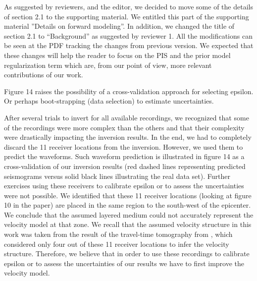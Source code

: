 \documentclass[10pt]{extarticle}
\begin{document}
\begin{Answer}
As suggested by reviewers, and the editor, we decided to move some of the 
details of section 2.1 to the supporting material. We entitled this part of the 
supporting material ''Details on forward modeling''. In addition, we changed 
the title of section 2.1 to ``Background'' as suggested by reviewer 1.
All the modifications can be seen at the PDF tracking the changes from previous version.
We expected that these changes will help the reader to focus on the PIS and the 
prior model regularization term which are, from our point of view, more relevant 
contributions of our work. \\
 \WorkInProgressRevTask
\end{Answer}
%
%
\begin{ReviewerComment}{1}
\noindent 
 Figure 14 raises the possibility of a cross-validation approach for selecting epsilon. Or
 perhaps boot-strapping (data selection) to estimate uncertainties.
\end{ReviewerComment}
%
\begin{Answer}
 After several trials to invert for all available recordings, we recognized that 
 some of the recordings were more complex than the others and that their 
 complexity were drastically impacting the inversion results. In the end, we
 had to completely discard the 11 receiver locations from the inversion. However,
 we used them to predict the waveforms. Such waveform prediction is illustrated 
 in figure 14 as a cross-validation of our inversion results (red dashed lines 
 representing predicted seismograms versus solid black lines illustrating the real 
 data set). Further exercises using these receivers to calibrate epsilon or to 
 assess the uncertainties were not possible. We identified that these 11 receiver 
 locations (looking at figure 10 in the paper) are placed in the same region to 
 the south-west of the epicenter. We conclude that the assumed layered medium could 
 not accurately represent the velocity model at that zone. We recall that the assumed 
 velocity structure in this work was taken from the result of the travel-time tomography 
 from \cite{Uchide_2016_KES}, which considered only four out of these 11 receiver 
 locations to infer the velocity structure. Therefore, we believe that in order to use 
 these recordings to calibrate epsilon or to assess the uncertainties of our results 
 we have to first improve the velocity model.
 \WorkInProgressRevTask
\end{Answer}
\end{document}
